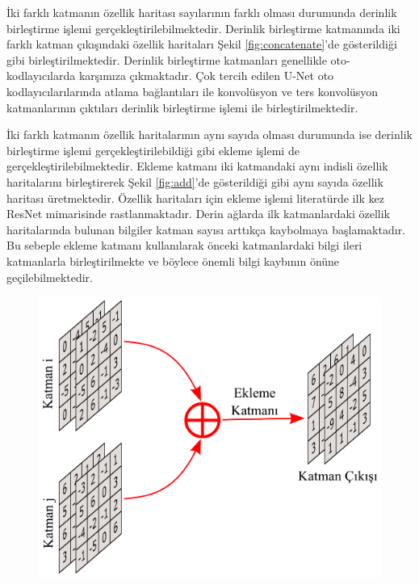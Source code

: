 İki farklı katmanın özellik haritası sayılarının farklı olması durumunda derinlik birleştirme işlemi gerçekleştirilebilmektedir. Derinlik birleştirme katmanında iki farklı katman çıkışındaki özellik haritaları Şekil \ref{fig:concatenate}'de gösterildiği gibi birleştirilmektedir. Derinlik birleştirme katmanları genellikle oto-kodlayıcılarda karşımıza çıkmaktadır. Çok tercih edilen U-Net oto kodlayıcılarılarında \cite{ronneberger2015u} atlama bağlantıları ile konvolüsyon ve ters konvolüsyon katmanlarının çıktıları derinlik birleştirme işlemi ile birleştirilmektedir.

İki farklı katmanın özellik haritalarının aynı sayıda olması durumunda ise derinlik birleştirme işlemi gerçekleştirilebildiği gibi ekleme işlemi de gerçekleştirilebilmektedir. Ekleme katmanı iki katmandaki aynı indisli özellik haritalarını birleştirerek Şekil \ref{fig:add}'de gösterildiği gibi aynı sayıda özellik haritası üretmektedir. Özellik haritaları için ekleme işlemi literatürde ilk kez ResNet mimarisinde \cite{he2016deep} rastlanmaktadır. Derin ağlarda ilk katmanlardaki özellik haritalarında bulunan bilgiler katman sayısı arttıkça kaybolmaya başlamaktadır. Bu sebeple ekleme katmanı kullanılarak önceki katmanlardaki bilgi ileri katmanlarla birleştirilmekte ve böylece önemli bilgi kaybının önüne geçilebilmektedir.

\begin{figure}[h!]
	\begin{center}
		\vspace{0.4cm}
		{
			\vspace{0.4cm}
			\includegraphics[scale=0.43]{Yapilan-Calismalar/Figures/add.pdf}
		}
	\end{center}
\end{figure}

